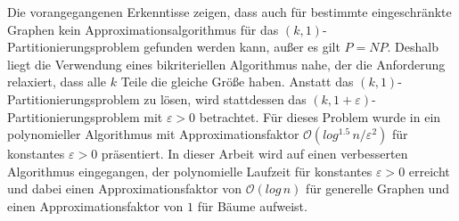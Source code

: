 Die vorangegangenen Erkenntisse zeigen, dass auch für bestimmte eingeschränkte Graphen kein Approximationsalgorithmus für das $(k,1)$-Partitionierungsproblem gefunden werden kann, außer es gilt $P=NP$. 
Deshalb liegt die Verwendung eines bikriteriellen Algorithmus nahe, der die Anforderung relaxiert, dass alle $k$ Teile die gleiche Größe haben.
Anstatt das $(k,1)$-Partitionierungsproblem zu lösen, wird stattdessen das $(k,1+\varepsilon)$-Partitionierungsproblem mit $\varepsilon > 0$ betrachtet.
Für dieses Problem wurde in \parencite{ar06} ein polynomieller Algorithmus mit Approximationsfaktor $\mathcal{O}(log^{1.5}\, n / \varepsilon^2)$ für konstantes $\varepsilon > 0$ präsentiert.
In dieser Arbeit wird auf einen verbesserten Algorithmus eingegangen, der polynomielle Laufzeit für konstantes $\varepsilon > 0$ erreicht und dabei einen Approximationsfaktor von $\mathcal{O}(log\, n)$ für generelle Graphen und einen Approximationsfaktor von $1$ für Bäume aufweist.


